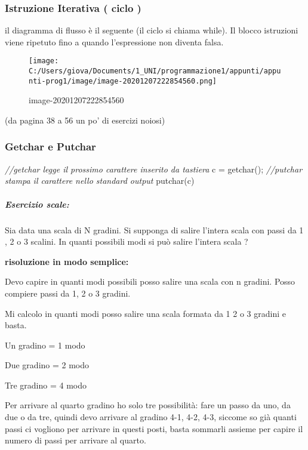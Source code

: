 \documentclass[
]{article}
\newenvironment{Shaded}{}{}
\newcommand{\CommentTok}[1]{\textcolor[rgb]{0.38,0.63,0.69}{\textit{#1}}}
\newcommand{\NormalTok}[1]{#1}
\begin{document}
\hypertarget{header-n388}{%
\subsubsection{Istruzione Iterativa ( ciclo )}\label{header-n388}}

il diagramma di flusso è il seguente (il ciclo si chiama while). Il
blocco istruzioni viene ripetuto fino a quando l'espressione non diventa
falsa.

\begin{figure}
\centering
\texttt{[image: C:/Users/giova/Documents/1\_UNI/programmazione1/appunti/appunti-prog1/image/image-20201207222854560.png]}
\caption{image-20201207222854560}
\end{figure}

(da pagina 38 a 56 un po' di esercizi noiosi)

\hypertarget{header-n394}{%
\subsubsection{Getchar e Putchar}\label{header-n394}}

\begin{Shaded}
\begin{Highlighting}[]
\CommentTok{//getchar legge il prossimo carattere inserito da tastiera}
\NormalTok{c = getchar();}
\CommentTok{//putchar stampa il carattere nello standard output}
\NormalTok{putchar(c)}
\end{Highlighting}
\end{Shaded}

\hypertarget{header-n397}{%
\subparagraph{Esercizio scale:}\label{header-n397}}

Sia data una scala di N gradini. Si supponga di salire l'intera scala
con passi da 1 , 2 o 3 scalini. In quanti possibili modi si può salire
l'intera scala ?

\textbf{risoluzione in modo semplice:}

Devo capire in quanti modi possibili posso salire una scala con n
gradini. Posso compiere passi da 1, 2 o 3 gradini.

Mi calcolo in quanti modi posso salire una scala formata da 1 2 o 3
gradini e basta.

Un gradino = 1 modo

Due gradino = 2 modo

Tre gradino = 4 modo

Per arrivare al quarto gradino ho solo tre possibilità: fare un passo da
uno, da due o da tre, quindi devo arrivare al gradino 4-1, 4-2, 4-3,
siccome so già quanti passi ci vogliono per arrivare in questi posti,
basta sommarli assieme per capire il numero di passi per arrivare al
quarto.
\end{document}
